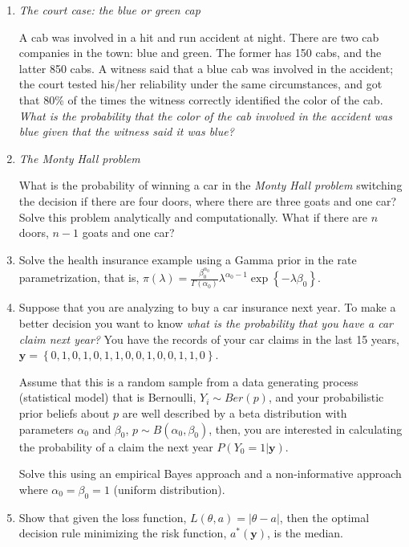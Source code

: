 \begin{enumerate}
	\item \textit{The court case: the blue or green cap}
	
	A cab was involved in a hit and run accident at night. There are two cab companies in the town: blue and green. The former has 150 cabs, and the latter 850 cabs. A witness said that a blue cab was involved in the accident; the court tested his/her reliability under the same circumstances, and got that 80\% of the times the witness correctly identified the color of the cab. \textit{What is the probability that the color of the cab involved in the accident was blue given that the witness said it was blue?}
	
	\item \textit{The Monty Hall problem}
	
	What is the probability of winning a car in the \textit{Monty Hall problem} switching the decision if there are four doors, where there are three goats and one car? Solve this problem analytically and computationally.  What if there are $n$ doors, $n-1$ goats and one car?
	
	\item Solve the health insurance example using a Gamma prior in the rate parametrization, that is, $\pi(\lambda)=\frac{\beta_0^{\alpha_0}}{\Gamma(\alpha_0)}\lambda^{\alpha_0-1}\exp\left\{-\lambda\beta_0\right\}$.  
	
	\item Suppose that you are analyzing to buy a car insurance next year. To make a better decision you want to know \textit{what is the probability that you have a car claim next year?} You have the records of your car claims in the last 15 years, $\mathbf{y}=\left\{0, 1, 0, 1, 0, 1, 1, 0, 0, 1, 0, 0, 1, 1, 0\right\}$.
	
	Assume that this is a random sample from a data generating process (statistical model) that is Bernoulli, $Y_i\sim Ber(p)$, and your probabilistic prior beliefs about $p$ are well described by a beta distribution with parameters $\alpha_0$ and $\beta_0$, $p\sim B(\alpha_0, \beta_0)$, then, you are interested in calculating the probability of a claim the next year $P(Y_0 = 1|\mathbf{y})$.
	
	Solve this using an empirical Bayes approach and a non-informative approach where $\alpha_0=\beta_0=1$ (uniform distribution). 
	
	\item Show that given the loss function, $L({\theta},a)=|{\theta}-a|$, then the optimal decision rule minimizing the risk function, $a^*(\mathbf{y})$, is the median.

\end{enumerate}



